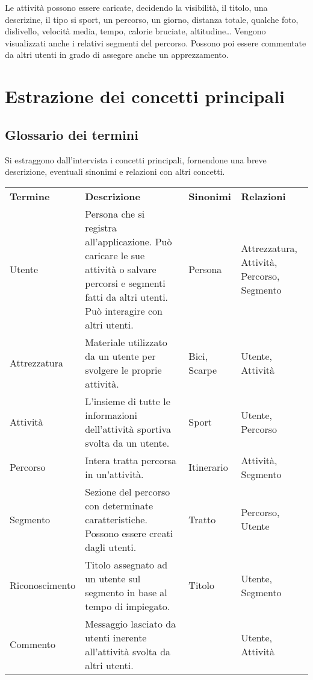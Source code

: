 \documentclass[12pt]{report}
\begin{document}
Le attività possono essere caricate, decidendo la visibilità, il titolo, una descrizine, il tipo si sport, 
un percorso, un giorno, distanza totale, qualche foto, dislivello, velocità media, tempo, calorie bruciate, altitudine\dots 
Vengono visualizzati anche i relativi segmenti del percorso. Possono poi essere commentate da altri 
utenti in grado di assegare anche un apprezzamento.

\section{Estrazione dei concetti principali}

\subsection*{Glossario dei termini}
Si estraggono dall'intervista i concetti principali, fornendone una breve descrizione, eventuali sinonimi e
relazioni con altri concetti.

\begin{table}[h!]
    \centering
    \renewcommand{\arraystretch}{1.5} %
    \begin{tabularx}{\textwidth}{
        >{\raggedright\arraybackslash}p{}%
        >{\raggedright\arraybackslash}p{}%
        >{\raggedright\arraybackslash}p{}%
        >{\raggedright\arraybackslash}p{}%
        }
    \arrayrulecolor[HTML]{BDBFC3}
    \rowcolor[HTML]{cef3fe} 
    \textbf{Termine} & \textbf{Descrizione} & \textbf{Sinonimi} & \textbf{Relazioni} \\
    Utente & Persona che si registra all'applicazione. Può caricare le sue attività o salvare percorsi e segmenti fatti da altri utenti. Può interagire con altri utenti. & Persona & Attrezzatura, Attività, Percorso, Segmento\\ \hline
    Attrezzatura & Materiale utilizzato da un utente per svolgere le proprie attività. & Bici, Scarpe & Utente, Attività \\ \hline 
	Attività & L'insieme di tutte le informazioni dell'attività sportiva svolta da un utente. & Sport & Utente, Percorso\\ \hline
    Percorso & Intera tratta percorsa in un'attività. & Itinerario & Attività, Segmento\\ \hline
    Segmento & Sezione del percorso con determinate caratteristiche. Possono essere creati dagli utenti. & Tratto & Percorso, Utente \\ \hline
    Riconoscimento & Titolo assegnato ad un utente sul segmento in base al tempo di impiegato. & Titolo & Utente, Segmento\\ \hline
	Commento & Messaggio lasciato da utenti inerente all'attività svolta da altri utenti. & & Utente, Attività \\
    \end{tabularx}
\end{table}
\end{document}
